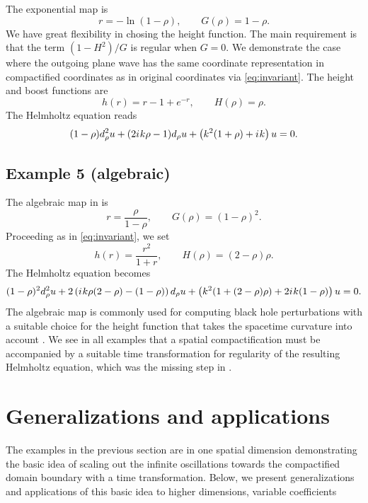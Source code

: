 \documentclass[onefignum,onetabnum]{siamart190516}
\newcommand{\be}{\begin{equation}}
\newcommand{\ee}{\end{equation}}
\newcommand{\iu}{{i\mkern1mu}}
\begin{document}
The exponential map is
\be\label{eq:ex4_mapping} r = -\ln(1-\rho), \qquad G(\rho) = 1-\rho. \ee
We have great flexibility in chosing the height function. The main requirement is that the term $(1-H^2)/G$ is regular when $G=0$. We demonstrate the case where the outgoing plane wave has the same coordinate representation in compactified coordinates as in original coordinates via \eqref{eq:invariant}. The height and boost functions are
\[ h(r) = r - 1 + e^{-r}, \qquad H(\rho) = \rho. \]
The Helmholtz equation reads
\[  (1-\rho) d_\rho^2 u + (2 \iu k \rho - 1) d_\rho u + \left(k^2(1+\rho) + \iu k \right) u = 0. \]

\subsection{Example 5 (algebraic)}\label{sec:alg}
The algebraic map in \cite{GroschOrszag77} is
\be\label{eq:ext_mapping} r = \frac{\rho}{1-\rho}, \qquad G(\rho) = (1-\rho)^2. \ee
Proceeding as in \eqref{eq:invariant}, we set
\[ h(r) = \frac{r^2}{1+r},\qquad H(\rho) = (2-\rho)\rho.\]
The Helmholtz equation becomes
\[ (1-\rho)^2 d_\rho^2 u + 2 \left( \iu k \rho (2-\rho) - (1-\rho) \right)d_\rho u + \left( k^2 (1+(2-\rho)\rho) + 2 \iu k (1-\rho)  \right) u = 0. \]
The algebraic map is commonly used for computing black hole perturbations with a suitable choice for the height function that takes the spacetime curvature into account \cite{Zenginoglu08s, Zenginoglu09, bizon2010saddle}. We see in all examples that a spatial compactification must be accompanied by a suitable time transformation for regularity of the resulting Helmholtz equation, which was the missing step in \cite{GroschOrszag77}.
\section{Generalizations and applications}\label{sec:nic_general}
The examples in the previous section are in one spatial dimension demonstrating the basic idea of scaling out the infinite oscillations towards the compactified domain boundary with a time transformation. Below, we present generalizations and applications of this basic idea to higher dimensions, variable coefficients

\end{document}
